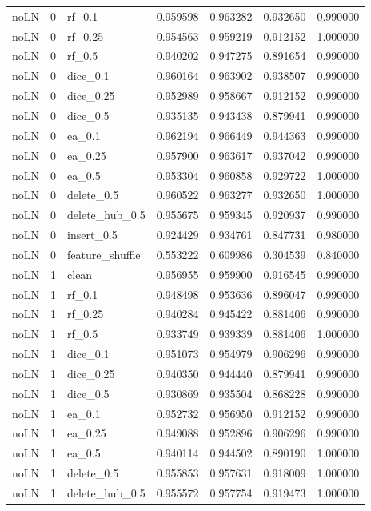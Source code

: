 \documentclass[UTF8,a4paper,11pt,fontset=fandol]{ctexart}
\begin{document}
{\begin{longtable}{lrlrrrr}
noLN & 0 & rf\_0.1 & 0.959598 & 0.963282 & 0.932650 & 0.990000 \\
noLN & 0 & rf\_0.25 & 0.954563 & 0.959219 & 0.912152 & 1.000000 \\
noLN & 0 & rf\_0.5 & 0.940202 & 0.947275 & 0.891654 & 0.990000 \\
noLN & 0 & dice\_0.1 & 0.960164 & 0.963902 & 0.938507 & 0.990000 \\
noLN & 0 & dice\_0.25 & 0.952989 & 0.958667 & 0.912152 & 0.990000 \\
noLN & 0 & dice\_0.5 & 0.935135 & 0.943438 & 0.879941 & 0.990000 \\
noLN & 0 & ea\_0.1 & 0.962194 & 0.966449 & 0.944363 & 0.990000 \\
noLN & 0 & ea\_0.25 & 0.957900 & 0.963617 & 0.937042 & 0.990000 \\
noLN & 0 & ea\_0.5 & 0.953304 & 0.960858 & 0.929722 & 1.000000 \\
noLN & 0 & delete\_0.5 & 0.960522 & 0.963277 & 0.932650 & 1.000000 \\
noLN & 0 & delete\_hub\_0.5 & 0.955675 & 0.959345 & 0.920937 & 0.990000 \\
noLN & 0 & insert\_0.5 & 0.924429 & 0.934761 & 0.847731 & 0.980000 \\
noLN & 0 & feature\_shuffle & 0.553222 & 0.609986 & 0.304539 & 0.840000 \\
noLN & 1 & clean & 0.956955 & 0.959900 & 0.916545 & 0.990000 \\
noLN & 1 & rf\_0.1 & 0.948498 & 0.953636 & 0.896047 & 0.990000 \\
noLN & 1 & rf\_0.25 & 0.940284 & 0.945422 & 0.881406 & 0.990000 \\
noLN & 1 & rf\_0.5 & 0.933749 & 0.939339 & 0.881406 & 1.000000 \\
noLN & 1 & dice\_0.1 & 0.951073 & 0.954979 & 0.906296 & 0.990000 \\
noLN & 1 & dice\_0.25 & 0.940350 & 0.944440 & 0.879941 & 0.990000 \\
noLN & 1 & dice\_0.5 & 0.930869 & 0.935504 & 0.868228 & 0.990000 \\
noLN & 1 & ea\_0.1 & 0.952732 & 0.956950 & 0.912152 & 0.990000 \\
noLN & 1 & ea\_0.25 & 0.949088 & 0.952896 & 0.906296 & 0.990000 \\
noLN & 1 & ea\_0.5 & 0.940114 & 0.944502 & 0.890190 & 1.000000 \\
noLN & 1 & delete\_0.5 & 0.955853 & 0.957631 & 0.918009 & 1.000000 \\
noLN & 1 & delete\_hub\_0.5 & 0.955572 & 0.957754 & 0.919473 & 1.000000 \\

\end{longtable}}
\end{document}
